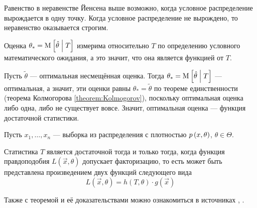 \begin{remark}
  Равенство в неравенстве Йенсена выше возможно,
  когда условное распределение вырождается в одну точку.
  Когда условное распределение не вырождено,
  то неравенство оказывается строгим.
\end{remark}

\begin{remark}
  Оценка $\theta_* = \operatorname{M}_{} \left[ \hat{\theta} \;\middle|\; T \right]$ измерима относительно $T$
  по определению условного математического ожидания, а это значит,
  что она является функцией от $T$.

  Пусть $\tilde{\theta}$ --- оптимальная несмещённая оценка.
  Тогда $\theta_* = \operatorname{M}_{} \left[ \hat{\theta} \;\middle|\; T \right]$ --- оптимальная, а значит,
  эти оценки равны $\theta_* = \tilde{\theta}$ по теореме единственности
  (теорема Колмогорова \ref{theorem:Kolmogorov}),
  поскольку оптимальная оценка либо одна, либо не существует вовсе.
  Значит, оптимальная оценка --- функция достаточной статистики.
\end{remark}

\begin{theorem}
  Пусть $x_1, \dots, x_n$ --- выборка из распределения
  с плотностью $p\left(x,\theta\right)$, $\theta \in \Theta$.

  Статистика $T$ является достаточной тогда и только тогда, когда
  функция правдоподобия $L\left( \vec{x}, \theta \right)$
  допускает факторизацию, то есть может быть представлена
  произведением двух функций следующего вида
  $$L\left( \vec{x}, \theta \right)
      = h\left( T, \theta \right) \cdot g\left( \vec{x} \right)$$
\end{theorem}

\begin{remark}
  Также с теоремой и её доказательствами можно ознакомиться в источниках
  \cite[стр.~78]{MGTUXVII}, \cite[стр.~158]{BorovkovMS}.
\end{remark}

